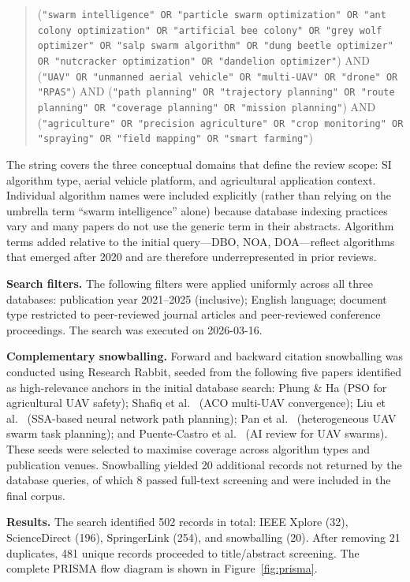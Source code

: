 \documentclass[review,3p,times]{elsarticle}
\begin{document}
\begin{quote}
\small
(\texttt{"swarm intelligence" OR "particle swarm optimization" OR "ant colony optimization"
OR "artificial bee colony" OR "grey wolf optimizer" OR "salp swarm algorithm"
OR "dung beetle optimizer" OR "nutcracker optimization" OR "dandelion optimizer"})
AND (\texttt{"UAV" OR "unmanned aerial vehicle" OR "multi-UAV" OR "drone" OR "RPAS"})
AND (\texttt{"path planning" OR "trajectory planning" OR "route planning"
OR "coverage planning" OR "mission planning"})
AND (\texttt{"agriculture" OR "precision agriculture" OR "crop monitoring"
OR "spraying" OR "field mapping" OR "smart farming"})
\end{quote}

The string covers the three conceptual domains that define the review scope: SI algorithm type, aerial vehicle platform, and agricultural application context. Individual algorithm names were included explicitly (rather than relying on the umbrella term ``swarm intelligence'' alone) because database indexing practices vary and many papers do not use the generic term in their abstracts. Algorithm terms added relative to the initial query---DBO, NOA, DOA---reflect algorithms that emerged after 2020 and are therefore underrepresented in prior reviews.

\textbf{Search filters.} The following filters were applied uniformly across all three databases: publication year 2021--2025 (inclusive); English language; document type restricted to peer-reviewed journal articles and peer-reviewed conference proceedings. The search was executed on 2026-03-16.

\textbf{Complementary snowballing.} Forward and backward citation snowballing was conducted using Research Rabbit, seeded from the following five papers identified as high-relevance anchors in the initial database search: Phung \& Ha \cite{phung2021} (PSO for agricultural UAV safety); Shafiq et al.\ \cite{shafiq2022} (ACO multi-UAV convergence); Liu et al.\ \cite{liu2021} (SSA-based neural network path planning); Pan et al.\ \cite{pan2022} (heterogeneous UAV swarm task planning); and Puente-Castro et al.\ \cite{puente2022} (AI review for UAV swarms). These seeds were selected to maximise coverage across algorithm types and publication venues. Snowballing yielded 20 additional records not returned by the database queries, of which 8 passed full-text screening and were included in the final corpus.

\textbf{Results.} The search identified 502 records in total: IEEE Xplore (32), ScienceDirect (196), SpringerLink (254), and snowballing (20). After removing 21 duplicates, 481 unique records proceeded to title/abstract screening. The complete PRISMA flow diagram is shown in Figure~\ref{fig:prisma}.
\end{document}
